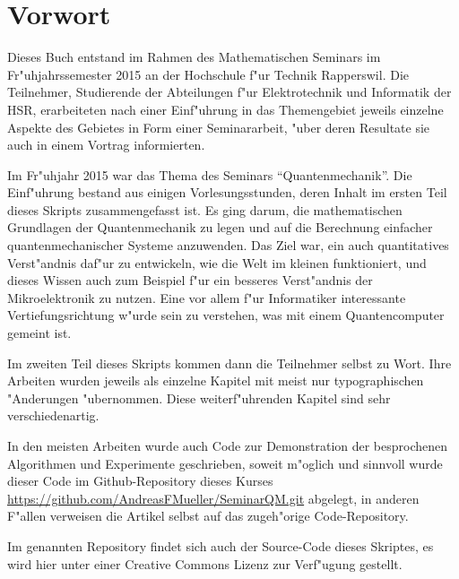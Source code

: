 \chapter*{Vorwort}
\rhead{}
Dieses Buch entstand im Rahmen des Mathematischen Seminars
im Fr"uhjahrssemester 2015 an der Hochschule f"ur Technik Rapperswil.
Die Teilnehmer, Studierende der Abteilungen f"ur Elektrotechnik und
Informatik der
HSR, erarbeiteten nach einer Einf"uhrung in das Themengebiet jeweils
einzelne Aspekte des Gebietes in Form einer Seminararbeit, "uber
deren Resultate sie auch in einem Vortrag informierten. 

Im Fr"uhjahr 2015 war das Thema des Seminars ``Quantenmechanik''.
Die Einf"uhrung bestand aus einigen Vorlesungsstunden, deren
Inhalt im ersten Teil dieses Skripts zusammengefasst ist.
Es ging darum, die mathematischen Grundlagen der Quantenmechanik zu
legen und auf die Berechnung einfacher quantenmechanischer 
Systeme anzuwenden. Das Ziel war, ein auch quantitatives Verst"andnis
daf"ur zu entwickeln, wie die Welt im kleinen funktioniert, und 
dieses Wissen auch zum Beispiel f"ur ein besseres Verst"andnis der
Mikroelektronik zu nutzen. Eine vor allem f"ur Informatiker interessante
Vertiefungsrichtung w"urde sein zu verstehen, was mit einem Quantencomputer
gemeint ist.

Im zweiten Teil dieses Skripts kommen dann die Teilnehmer
selbst zu Wort. Ihre Arbeiten wurden jeweils als einzelne
Kapitel mit meist nur typographischen "Anderungen "ubernommen.
Diese weiterf"uhrenden Kapitel sind sehr verschiedenartig.

In den meisten Arbeiten wurde auch Code zur Demonstration der 
besprochenen Algorithmen und Experimente geschrieben, soweit
m"oglich und sinnvoll wurde dieser Code im Github-Repository
dieses Kurses \url{https://github.com/AndreasFMueller/SeminarQM.git}
abgelegt, in anderen F"allen verweisen die Artikel selbst auf
das zugeh"orige Code-Repository.

Im genannten Repository findet sich auch der Source-Code dieses
Skriptes, es wird hier unter einer Creative Commons Lizenz
zur Verf"ugung gestellt.

